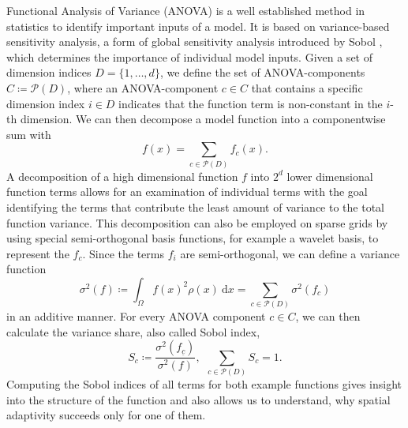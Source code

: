 \documentclass[
  a4paper,  %
  twoside,  %
  bibliography=totoc,
  headsepline,
  cleardoublepage=empty,
  parskip=half,
  draft=false
]{scrbook}
\begin{document}
Functional Analysis of Variance (ANOVA)  is a well established method in statistics to identify important inputs of a model.
It is based on variance-based sensitivity analysis, a form of global sensitivity analysis introduced by Sobol \cite{S01}, which determines the importance of individual model inputs.
Given a set of dimension indices $D=\{1,\dots,d\}$, we define the set of ANOVA-components $C \coloneqq \mathcal{P}(D)$, where an ANOVA-component $c \in C$ that contains a specific dimension index $i \in D$ indicates that the function term is non-constant in the $i$-th dimension.
We can then decompose a model function into a componentwise sum with
\begin{equation}
f(x)=\sum_{c \in \mathcal{P}(D)} f_{c}(x).
\label{anovaComp}
\end{equation}
%
A decomposition of a high dimensional function $f$ into $2^d$ lower dimensional function terms allows for an examination of individual terms with the goal identifying the terms that contribute the least amount of variance to the total function variance.
This decomposition can also be employed on sparse grids \cite{F10} by using special semi-orthogonal basis functions, for example a wavelet basis, to represent the $f_c$.
Since the terms $f_i$ are semi-orthogonal, we can define a variance function
\begin{equation}
\sigma^2(f) \coloneqq \int_{\Omega} f(x)^2 \rho(x) ~ \text{d} x=\sum_{c \in \mathcal{P}(D)} \sigma^2(f_c)
\end{equation}
in an additive manner.
For every ANOVA component $c \in C$, we can then calculate the variance share, also called Sobol index,
\begin{equation}
S_{c} \coloneqq \frac{\sigma^2(f_{\underline{c}} )}{\sigma^2(f)}, ~~ \sum_{c \in \mathcal{P}(D)} S_{c} = 1.
\nonumber
\end{equation}
Computing the Sobol indices of all terms for both example functions gives insight into the structure of the function and also allows us to understand, why spatial adaptivity succeeds only for one of them.
\end{document}
